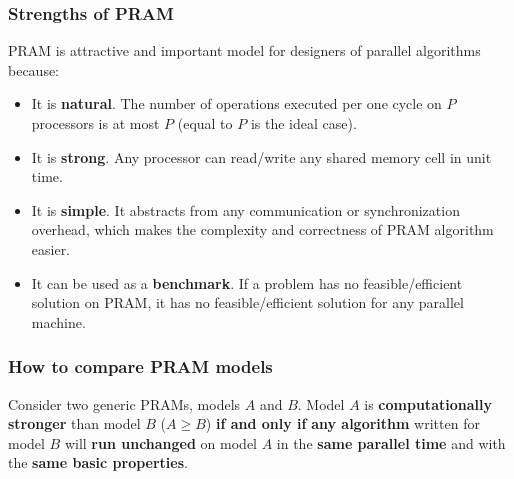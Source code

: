 \subsubsection{Strengths of PRAM}

PRAM is attractive and important model for designers of parallel algorithms because:
\begin{itemize}
    \item It is \textbf{natural}. The number of operations executed per one cycle on $P$ processors is at most $P$ (equal to $P$ is the ideal case).

    \item It is \textbf{strong}. Any processor can read/write any shared memory cell in unit time.

    \item It is \textbf{simple}. It abstracts from any communication or synchronization overhead, which makes the complexity and correctness of PRAM algorithm easier.

    \item It can be used as a \textbf{benchmark}. If a problem has no feasible/efficient solution on PRAM, it has no feasible/efficient solution for any parallel machine.
\end{itemize}

\longline

\subsubsection{How to compare PRAM models}

Consider two generic PRAMs, models $A$ and $B$. Model $A$ is \textbf{computationally stronger} than model $B$ ($A \ge B$) \textbf{if and only if} \textbf{any algorithm} written for model $B$ will \textbf{run unchanged} on model $A$ in the \textbf{same parallel time} and with the \textbf{same basic properties}.

